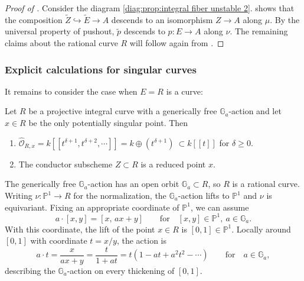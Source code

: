 \documentclass[reqno, letterpaper]{amsart}
\numberwithin{equation}{subsection}
\let\to\longrightarrow
\newcommand{\GG}{\mathbb{G}}
\newcommand{\PP}{\mathbb{P}}
\begin{document}
			\begin{proof}[Proof of ]
				Consider the diagram \eqref{diag:prop:integral fiber unstable 2}.  shows that the composition $\tilde Z \hookrightarrow \tilde E \to A$ descends to an isomorphism $Z \to A$ along $\mu$. By the universal property of pushout, $\tilde p$ descends to $p : E \to A$ along $\nu$. The remaining claims about the rational curve $R$ will follow again from .
			\end{proof}
			
			
			
		\subsubsection{Explicit calculations for singular curves}
			It remains to consider the case when $E = R$ is a curve:
			
			\begin{proposition} \label{prop:curve}
				Let $R$ be a projective integral curve with a generically free $\GG_a$-action and let $x \in R$ be the only potentially singular point. Then
				\begin{enumerate}
					\item $\hat {\mathcal O}_{R, x} = k[[t^{\delta+1}, t^{\delta+2}, \cdots]] = k \oplus (t^{\delta+1}) \ \subset k[[t]]$ for $\delta \ge 0$.
					\item The conductor subscheme $Z \subset R$ is a reduced point $x$.
				\end{enumerate}
			\end{proposition}
			
			The generically free $\GG_a$-action has an open orbit $\GG_a \subset R$, so $R$ is a rational curve. Writing $\nu : \PP^1 \to R$ for the normalization, the $\GG_a$-action lifts to $\PP^1$ and $\nu$ is equivariant. Fixing an appropriate coordinate of $\PP^1$, we can assume
			\[ a \cdot [x,y] = [x, \, ax + y] \qquad\mbox{for}\quad [x,y] \in \PP^1 ,\ a \in \GG_a .\]
			With this coordinate, the lift of the point $x \in R$ is $[0,1] \in \PP^1$. Locally around $[0,1]$ with coordinate $t = x/y$, the action is
			\begin{equation} \label{eq:Ga-action}
				a \cdot t = \frac{x}{ax + y} = \frac{t}{1 + at} = t (1 - at + a^2t^2 - \cdots) \qquad\mbox{for}\quad a \in \GG_a ,
			\end{equation}
			describing the $\GG_a$-action on every thickening of $[0,1]$.
			
\end{document}
